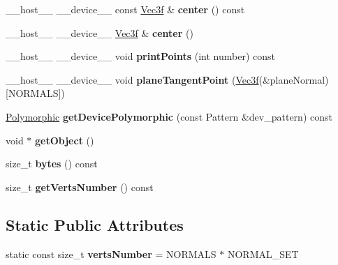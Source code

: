 \begin{DoxyCompactItemize}
\item 
\+\_\+\+\_\+host\+\_\+\+\_\+ \+\_\+\+\_\+device\+\_\+\+\_\+ const \hyperlink{class_vec3}{Vec3f} \& {\bfseries center} () const\hypertarget{class_sphere_aa42da7338d536728abf563bc57fcb819}{}\label{class_sphere_aa42da7338d536728abf563bc57fcb819}

\item 
\+\_\+\+\_\+host\+\_\+\+\_\+ \+\_\+\+\_\+device\+\_\+\+\_\+ \hyperlink{class_vec3}{Vec3f} \& {\bfseries center} ()\hypertarget{class_sphere_a15a8c4847cea8d3a72ea91f9c71e8160}{}\label{class_sphere_a15a8c4847cea8d3a72ea91f9c71e8160}

\item 
\+\_\+\+\_\+host\+\_\+\+\_\+ \+\_\+\+\_\+device\+\_\+\+\_\+ void {\bfseries print\+Points} (int number) const\hypertarget{class_sphere_a80b41ffe0cbe37bc7a174e2e2c3cd12d}{}\label{class_sphere_a80b41ffe0cbe37bc7a174e2e2c3cd12d}

\item 
\+\_\+\+\_\+host\+\_\+\+\_\+ \+\_\+\+\_\+device\+\_\+\+\_\+ void {\bfseries plane\+Tangent\+Point} (\hyperlink{class_vec3}{Vec3f}(\&plane\+Normal)\mbox{[}N\+O\+R\+M\+A\+LS\mbox{]})\hypertarget{class_sphere_a95ce96c8e7b11551f13231ec084505d5}{}\label{class_sphere_a95ce96c8e7b11551f13231ec084505d5}

\item 
\hyperlink{struct_polymorphic}{Polymorphic} {\bfseries get\+Device\+Polymorphic} (const Pattern \&dev\+\_\+pattern) const\hypertarget{class_sphere_a3b912df967e257861160b74a11ae09ce}{}\label{class_sphere_a3b912df967e257861160b74a11ae09ce}

\item 
void $\ast$ {\bfseries get\+Object} ()\hypertarget{class_sphere_a4c1b3cc7e4ba295d44f9bf18e8b6ad89}{}\label{class_sphere_a4c1b3cc7e4ba295d44f9bf18e8b6ad89}

\item 
size\+\_\+t {\bfseries bytes} () const\hypertarget{class_sphere_a4653e693258cda646d795212b88d8104}{}\label{class_sphere_a4653e693258cda646d795212b88d8104}

\item 
size\+\_\+t {\bfseries get\+Verts\+Number} () const\hypertarget{class_sphere_a8381fa5f8257232a97614b155316b7eb}{}\label{class_sphere_a8381fa5f8257232a97614b155316b7eb}

\end{DoxyCompactItemize}
\subsection*{Static Public Attributes}
\begin{DoxyCompactItemize}
\item 
static const size\+\_\+t {\bfseries verts\+Number} = N\+O\+R\+M\+A\+LS $\ast$ N\+O\+R\+M\+A\+L\+\_\+\+S\+ET\hypertarget{class_sphere_a09ea16832b08f08a175061af5568ae72}{}\label{class_sphere_a09ea16832b08f08a175061af5568ae72}

\end{DoxyCompactItemize}


